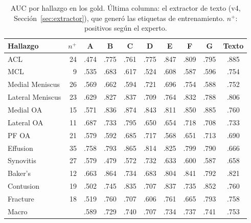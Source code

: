 \begin{table}[t]
  \caption{AUC por hallazgo en los gold. Última columna: el extractor de texto (v4, Sección~\ref{sec:extractor}), que generó las etiquetas de entrenamiento.
    $n^{+}$: positivos según el experto.}
  \label{tab:auc-hallazgo}
  \centering
  \small
  \setlength{\tabcolsep}{4pt}
  \begin{tabular}{@{}lrccccccc|c@{}}
    \toprule
    Hallazgo & $n^{+}$ & A & B & C & D & E & F & G & Texto \\
    \midrule
    ACL              & 24 & .474 & .775 & .761 & .775 & .847 & .809 & .795 & .885 \\
    MCL              &  9 & .535 & .683 & .617 & .524 & .608 & .587 & .596 & .754 \\
    Medial Meniscus  & 26 & .569 & .662 & .594 & .721 & .696 & .754 & .588 & .752 \\
    Lateral Meniscus & 23 & .629 & .827 & .837 & .709 & .764 & .832 & .788 & .806 \\
    Medial OA        & 15 & .571 & .836 & .874 & .843 & .811 & .850 & .885 & .760 \\
    Lateral OA       & 11 & .687 & .733 & .795 & .650 & .654 & .718 & .708 & .733 \\
    PF OA            & 21 & .579 & .592 & .685 & .717 & .568 & .651 & .713 & .690 \\
    Effusion         & 35 & .758 & .793 & .865 & .814 & .825 & .799 & .790 & .666 \\
    Synovitis        & 27 & .579 & .479 & .572 & .732 & .633 & .600 & .587 & .658 \\
    Baker's          & 12 & .663 & .864 & .734 & .683 & .804 & .841 & .792 & .821 \\
    Contusion        & 19 & .502 & .745 & .835 & .707 & .837 & .735 & .852 & .760 \\
    Fracture         & 18 & .519 & .760 & .707 & .606 & .761 & .665 & .793 & .758 \\
    \midrule
    Macro            &    & .589 & .729 & .740 & .707 & .734 & .737 & .741 & .753 \\
    \bottomrule
  \end{tabular}
\end{table}

